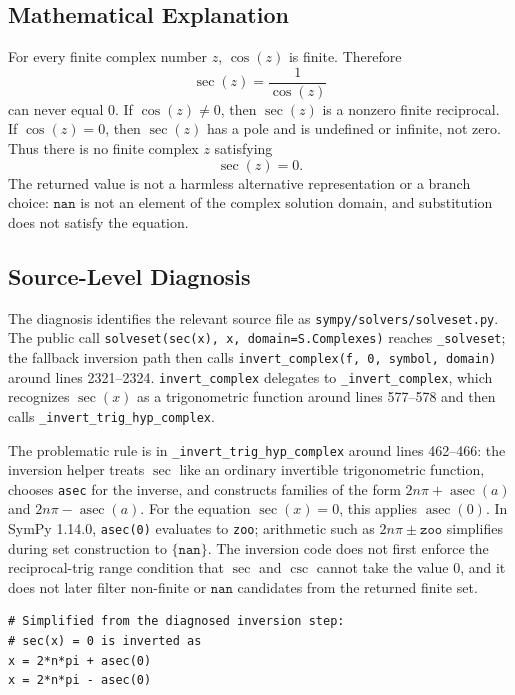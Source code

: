\documentclass[11pt]{article}
\begin{document}
\subsection{Mathematical Explanation}

For every finite complex number \(z\), \(\cos(z)\) is finite. Therefore
\[
    \sec(z) = \frac{1}{\cos(z)}
\]
can never equal \(0\). If \(\cos(z)\neq 0\), then \(\sec(z)\) is a nonzero
finite reciprocal. If \(\cos(z)=0\), then \(\sec(z)\) has a pole and is
undefined or infinite, not zero. Thus there is no finite complex \(z\) satisfying
\[
    \sec(z)=0.
\]
The returned value is not a harmless alternative representation or a branch
choice: \(\mathtt{nan}\) is not an element of the complex solution domain, and
substitution does not satisfy the equation.

\subsection{Source-Level Diagnosis}

The diagnosis identifies the relevant source file as
\nolinkurl{sympy/solvers/solveset.py}. The public call
\texttt{solveset(sec(x), x, domain=S.Complexes)} reaches \texttt{\_solveset};
the fallback inversion path then calls
\texttt{invert\_complex(f, 0, symbol, domain)} around lines 2321--2324.
\texttt{invert\_complex} delegates to \texttt{\_invert\_complex}, which
recognizes \(\sec(x)\) as a trigonometric function around lines 577--578 and
then calls \texttt{\_invert\_trig\_hyp\_complex}.

The problematic rule is in \texttt{\_invert\_trig\_hyp\_complex} around lines
462--466: the inversion helper treats \(\sec\) like an ordinary invertible
trigonometric function, chooses \texttt{asec} for the inverse, and constructs
families of the form \(2n\pi+\operatorname{asec}(a)\) and
\(2n\pi-\operatorname{asec}(a)\). For the equation \(\sec(x)=0\), this applies
\(\operatorname{asec}(0)\). In SymPy 1.14.0, \texttt{asec(0)} evaluates to
\texttt{zoo}; arithmetic such as \(2n\pi\pm\texttt{zoo}\) simplifies during set
construction to \(\{\mathtt{nan}\}\). The inversion code does not first enforce
the reciprocal-trig range condition that \(\sec\) and \(\csc\) cannot take the
value \(0\), and it does not later filter non-finite or \(\mathtt{nan}\)
candidates from the returned finite set.

\begin{lstlisting}[style=bugpython]
# Simplified from the diagnosed inversion step:
# sec(x) = 0 is inverted as
x = 2*n*pi + asec(0)
x = 2*n*pi - asec(0)
\end{lstlisting}
\end{document}
